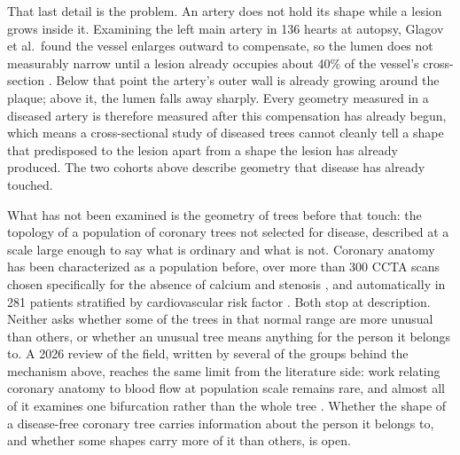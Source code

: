 That last detail is the problem.
An artery does not hold its shape while a lesion grows inside it.
Examining the left main artery in 136 hearts at autopsy, Glagov et al.\ found the vessel enlarges
outward to compensate, so the lumen does not measurably narrow until a lesion already occupies about
40\% of the vessel's cross-section \cite{glagov1987remodeling}.
Below that point the artery's outer wall is already growing around the plaque; above it, the lumen
falls away sharply.
Every geometry measured in a diseased artery is therefore measured after this compensation has
already begun, which means a cross-sectional study of diseased trees cannot cleanly tell a shape that
predisposed to the lesion apart from a shape the lesion has already produced.
The two cohorts above describe geometry that disease has already touched.

What has not been examined is the geometry of trees before that touch: the topology of a population
of coronary trees not selected for disease, described at a scale large enough to say what is
ordinary and what is not.
Coronary anatomy has been characterized as a population before, over more than 300 CCTA scans
chosen specifically for the absence of calcium and stenosis \cite{medranogracia2016atlas}, and
automatically in 281 patients stratified by cardiovascular risk factor
\cite{nannini2024characterization}.
Both stop at description.
Neither asks whether some of the trees in that normal range are more unusual than others, or whether
an unusual tree means anything for the person it belongs to.
A 2026 review of the field, written by several of the groups behind the mechanism above, reaches the
same limit from the literature side: work relating coronary anatomy to blood flow at population
scale remains rare, and almost all of it examines one bifurcation rather than the whole tree
\cite{shen2026geometry}.
Whether the shape of a disease-free coronary tree carries information about the person it belongs to,
and whether some shapes carry more of it than others, is open.
